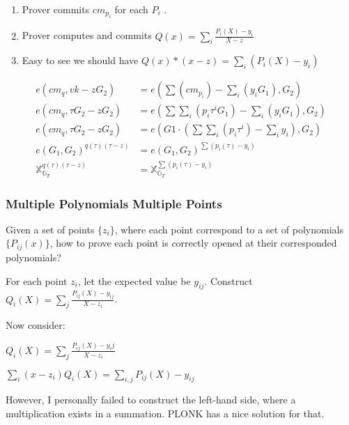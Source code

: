 \documentclass[10pt]{article}
\begin{document}
\begin{enumerate}
    \item Prover commits $cm_{p_i}$ for each $P_i$ .
    \item Prover computes and commits $Q(x) = \sum_i{\frac{P_i(X) - y_i}{X-z}}$
    \item Easy to see we should have $Q(x) * (x-z) = \sum_i{(P_i(X) - y_i)}$
\end{enumerate}
\[
\begin{aligned}
    e({cm}_q, vk - zG_2) &= e(\sum({cm}_{p_i})-\sum_i{(y_i G_1)}, G_2)\\
    e({cm}_q, \tau G_2 - zG_2) &= e(\sum\sum_i(p_i\tau^i G_1)
                            -\sum_i{(y_i G_1)}, G_2)\\
    e({cm}_q, \tau G_2 - zG_2) &= e(G1\cdot (\sum\sum_i{(p_i\tau^i)} - \sum_i{y_i}), G_2)\\
    e(G_1, G_2)^{q(\tau)(\tau - z)} &= e(G_1,G_2)^{\sum{(p_i(\tau)-y_i)}}\\
    \mathbb{X}^{q(\tau)(\tau - z)}_{\mathbb{G}_T} &= \mathbb{X}^{\sum{(p_i(\tau)-y_i)}}_{\mathbb{G}_T}
\end{aligned}
\]
\newpage
\subsubsection{Multiple Polynomials Multiple Points}
Given a set of points $\{z_{i}\}$, where each point correspond to a set of polynomials
$\{P_{ij}(x)\}$, how to prove each point is correctly opened at their
corresponded polynomials?

For each point $z_i$, let the expected value be $y_{ij}$.
Construct $Q_i(X) = \sum_j\frac{P_{ij}(X) - y_{ij}}{X-z_i}$.

Now consider:
\begin{description}
    \item $Q_i(X) = {\sum_j\frac{P_{ij}(X) - y_ij}{X-z_i}}$
    \item $\sum_i(x-z_i) Q_i(X) = \sum_{i,j} P_{ij}(X) - y_{ij}$
\end{description}
However, I personally failed to construct the left-hand side, where a
multiplication exists in a summation. PLONK has a nice solution for that.
\end{document}
